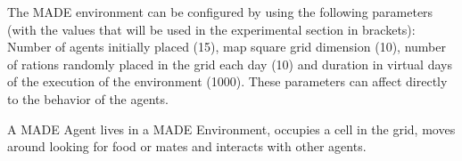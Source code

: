 \documentclass[letterpaper]{article}
\begin{document}

The MADE environment can be configured by using the following parameters (with the values that will be used in the experimental section in brackets): Number of agents initially placed (15), map square grid dimension (10), number of rations randomly placed in the grid each day (10) and duration in virtual days of the  execution of the environment (1000). These parameters can affect directly to the behavior of the agents.


A MADE Agent lives in a MADE Environment, occupies a cell in the grid, moves around looking for food or mates and interacts with other agents.\\
\end{document}
